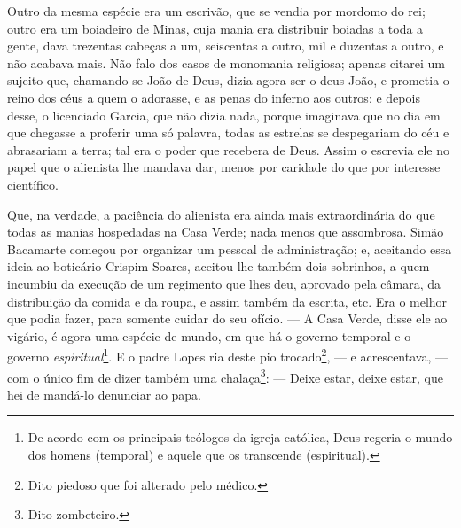 Outro da mesma espécie era um escrivão, que se vendia por mordomo do
rei; outro era um boiadeiro de Minas, cuja mania era distribuir boiadas
a toda a gente, dava trezentas cabeças a um, seiscentas a outro, mil e
duzentas a outro, e não acabava mais. Não falo dos casos de monomania
religiosa; apenas citarei um sujeito que, chamando-se João de Deus,
dizia agora ser o deus João, e prometia o reino dos céus a quem o
adorasse, e as penas do inferno aos outros; e depois desse, o licenciado
Garcia, que não dizia nada, porque imaginava que no dia em que chegasse
a proferir uma só palavra, todas as estrelas se despegariam do céu e
abrasariam a terra; tal era o poder que recebera de Deus. Assim o
escrevia ele no papel que o alienista lhe mandava dar, menos por
caridade do que por interesse científico.

Que, na verdade, a paciência do alienista era ainda mais extraordinária
do que todas as manias hospedadas na Casa Verde; nada menos que
assombrosa. Simão Bacamarte começou por organizar um pessoal de
administração; e, aceitando essa ideia ao boticário Crispim Soares,
aceitou-lhe também dois sobrinhos, a quem incumbiu da execução de um
regimento que lhes deu, aprovado pela câmara, da distribuição da comida
e da roupa, e assim também da escrita, etc. Era o melhor que podia
fazer, para somente cuidar do seu ofício. --- A Casa Verde, disse ele ao
vigário, é agora uma espécie de mundo, em que há o governo temporal e o
governo \emph{espiritual}\footnote{De acordo com os principais teólogos
  da igreja católica, Deus regeria o mundo dos homens (temporal) e
  aquele que os transcende (espiritual).}. E o padre Lopes ria deste pio
trocado\footnote{Dito piedoso que foi alterado pelo médico.}, --- e
acrescentava, --- com o único fim de dizer também uma chalaça\footnote{Dito
  zombeteiro.}: --- Deixe estar, deixe estar, que hei de mandá-lo
denunciar ao papa.

